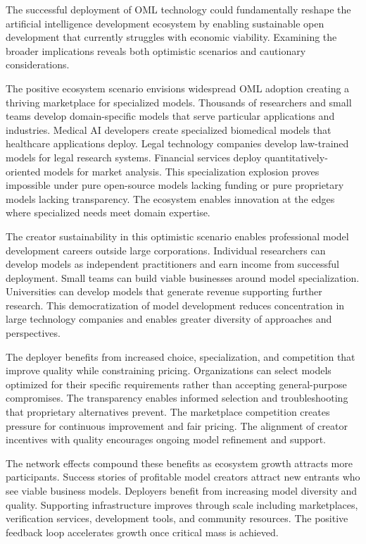 The successful deployment of OML technology could fundamentally reshape the artificial intelligence development ecosystem by enabling sustainable open development that currently struggles with economic viability. Examining the broader implications reveals both optimistic scenarios and cautionary considerations.

The positive ecosystem scenario envisions widespread OML adoption creating a thriving marketplace for specialized models. Thousands of researchers and small teams develop domain-specific models that serve particular applications and industries. Medical AI developers create specialized biomedical models that healthcare applications deploy. Legal technology companies develop law-trained models for legal research systems. Financial services deploy quantitatively-oriented models for market analysis. This specialization explosion proves impossible under pure open-source models lacking funding or pure proprietary models lacking transparency. The ecosystem enables innovation at the edges where specialized needs meet domain expertise.

The creator sustainability in this optimistic scenario enables professional model development careers outside large corporations. Individual researchers can develop models as independent practitioners and earn income from successful deployment. Small teams can build viable businesses around model specialization. Universities can develop models that generate revenue supporting further research. This democratization of model development reduces concentration in large technology companies and enables greater diversity of approaches and perspectives.

The deployer benefits from increased choice, specialization, and competition that improve quality while constraining pricing. Organizations can select models optimized for their specific requirements rather than accepting general-purpose compromises. The transparency enables informed selection and troubleshooting that proprietary alternatives prevent. The marketplace competition creates pressure for continuous improvement and fair pricing. The alignment of creator incentives with quality encourages ongoing model refinement and support.

The network effects compound these benefits as ecosystem growth attracts more participants. Success stories of profitable model creators attract new entrants who see viable business models. Deployers benefit from increasing model diversity and quality. Supporting infrastructure improves through scale including marketplaces, verification services, development tools, and community resources. The positive feedback loop accelerates growth once critical mass is achieved.

